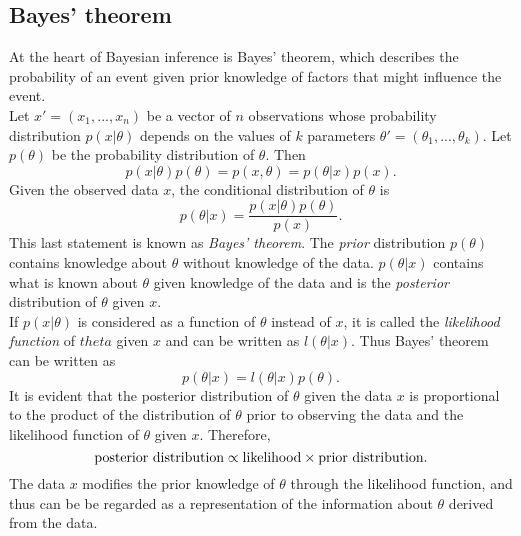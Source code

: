 \documentclass[12pt]{book}
\begin{document}
\subsection{Bayes' theorem}
At the heart of Bayesian inference is Bayes' theorem, which describes the probability of an event given prior knowledge of factors that might influence the event. \\
Let $x'=\left(x_1,...,x_n\right)$ be a vector of $n$ observations whose probability distribution $p\left(x|\theta\right)$ depends on the values of $k$ parameters $\theta'=\left(\theta_1,...,\theta_k\right)$. Let $p\left(\theta\right)$ be the probability distribution of $\theta$. Then 
\begin{equation}
    p\left(x|\theta\right)p\left(\theta\right)=p\left(x, \theta\right) = p\left(\theta|x\right)p\left(x\right).
\end{equation}
Given the observed data $x$, the conditional distribution of $\theta$ is
\begin{equation}
    p\left(\theta|x\right)=\frac{p\left(x|\theta\right)p\left(\theta\right)}{p\left(x\right)}.
\end{equation}
This last statement is known as \textit{Bayes' theorem}. The \textit{prior} distribution $p\left(\theta\right)$ contains knowledge about $\theta$ without knowledge of the data. $p\left(\theta|x\right)$ contains what is known about $\theta$ given knowledge of the data and is the \textit{posterior} distribution of $\theta$ given $x$. \\
If $p\left(x|\theta\right)$ is considered as a function of $\theta$ instead of $x$, it is called the \textit{likelihood function} of $theta$ given $x$ and can be written as $l\left(\theta|x\right)$. Thus Bayes' theorem can be written as
\begin{equation}
    p\left(\theta|x\right)=l\left(\theta|x\right)p\left(\theta\right).
\end{equation}
It is evident that the posterior distribution of $\theta$ given the data $x$ is proportional to the product of the distribution of $\theta$ prior to observing the data and the likelihood function of $\theta$ given $x$. Therefore,
\begin{equation*}
    \hbox{posterior distribution} \propto  \hbox{likelihood}\times\hbox{prior distribution}.
\end{equation*}
The data $x$ modifies the prior knowledge of $\theta$ through the likelihood function, and thus can be be regarded as a representation of the information about  $\theta$ derived from the data.\autocite[Cf.][]{box2011bayesian}
\end{document}

